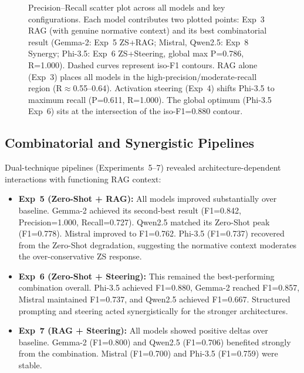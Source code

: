\documentclass{ieeeaccess}
\begin{document}
\begin{figure}[htbp]
\caption{Precision--Recall scatter plot across all models and key configurations. Each model contributes two plotted points: Exp~3 RAG (with genuine normative context) and its best combinatorial result (Gemma-2: Exp~5 ZS+RAG; Mistral, Qwen2.5: Exp~8 Synergy; Phi-3.5: Exp~6 ZS+Steering, global max P=0.786, R=1.000). Dashed curves represent iso-F1 contours. RAG alone (Exp~3) places all models in the high-precision/moderate-recall region (R$\approx$0.55--0.64). Activation steering (Exp~4) shifts Phi-3.5 to maximum recall (P=0.611, R=1.000). The global optimum (Phi-3.5 Exp~6) sits at the intersection of the iso-F1=0.880 contour.}
\label{fig:precision_recall}
\end{figure}

\subsection{Combinatorial and Synergistic Pipelines}

Dual-technique pipelines (Experiments~5--7) revealed architecture-dependent interactions with functioning RAG context:

\begin{itemize}
    \item \textbf{Exp~5 (Zero-Shot + RAG):} All models improved substantially over baseline. Gemma-2 achieved its second-best result (F1=0.842, Precision=1.000, Recall=0.727). Qwen2.5 matched its Zero-Shot peak (F1=0.778). Mistral improved to F1=0.762. Phi-3.5 (F1=0.737) recovered from the Zero-Shot degradation, suggesting the normative context moderates the over-conservative ZS response.
    \item \textbf{Exp~6 (Zero-Shot + Steering):} This remained the best-performing combination overall. Phi-3.5 achieved F1=0.880, Gemma-2 reached F1=0.857, Mistral maintained F1=0.737, and Qwen2.5 achieved F1=0.667. Structured prompting and steering acted synergistically for the stronger architectures.
    \item \textbf{Exp~7 (RAG + Steering):} All models showed positive deltas over baseline. Gemma-2 (F1=0.800) and Qwen2.5 (F1=0.706) benefited strongly from the combination. Mistral (F1=0.700) and Phi-3.5 (F1=0.759) were stable.
\end{itemize}
\end{document}
